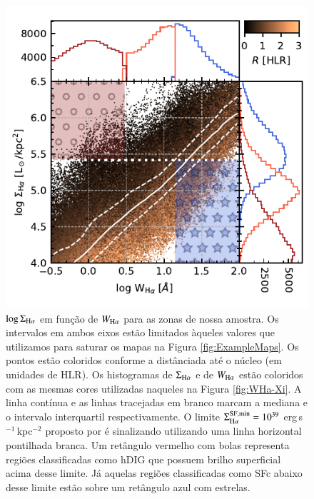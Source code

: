\begin{figure}
 \includegraphics[scale=1.5]{figuras/fig_logSBHa_logWHa_histograms.pdf}
 \caption[$\log {\rm H}\alpha \times \log \Sigma_{{\rm H}\alpha}$]
 {$\log \Sigma_{\Ha}$ em função de $W_{\Ha}$ para as zonas de nossa amostra. Os intervalos em ambos eixos estão limitados àqueles valores que utilizamos para saturar os mapas na Figura \ref{fig:ExampleMaps}. Os pontos estão coloridos conforme a distânciada até o núcleo (em unidades de HLR). Os histogramas de $\Sigma_{\Ha}$ e de $W_{\Ha}$ estão coloridos com as mesmas cores utilizadas naqueles na Figura \ref{fig:WHa-Xi}. A linha contínua e as linhas tracejadas em branco marcam a mediana e o intervalo interquartil respectivamente. O limite $\Sigma^{\rm SF,min}_{\Ha} = 10^{39}$ erg$\,$s$^{-1}\,$kpc$^{-2}$ proposto por \citet{Zhang.etal.2017a} é sinalizando utilizando uma linha horizontal pontilhada branca. Um retângulo vermelho com bolas representa regiões classificadas como hDIG que possuem brilho superficial acima desse limite. Já aquelas regiões classificadas como SFc abaixo desse limite estão sobre um retângulo azul com estrelas.}
 \label{fig:logWHa_logSBHa_histo}
\end{figure}

